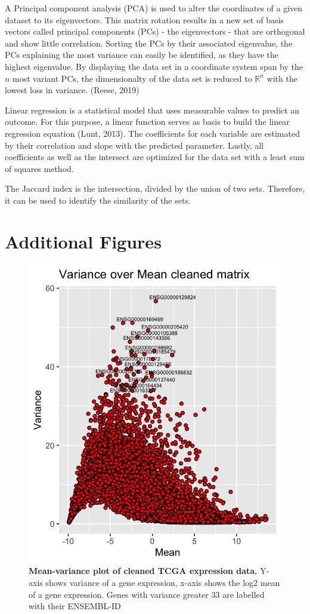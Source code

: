 \documentclass[
  11pt,
  parskip,
  oneside]{scrreprt}
\begin{document}
A Principal component analysis (PCA) is used to alter the coordinates of
a given dataset to its eigenvectors. This matrix rotation results in a
new set of basis vectors called principal components (PCs) - the
eigenvectors - that are orthogonal and show little correlation. Sorting
the PCs by their associated eigenvalue, the PCs explaining the most
variance can easily be identified, as they have the highest eigenvalue.
By displaying the data set in a coordinate system span by the \(n\) most
variant PCs, the dimensionalty of the data set is reduced to
\(\mathbb{R}^n\) with the lowest loss in variance. (Reese, 2019)

Linear regression is a statistical model that uses measurable values to
predict an outcome. For this purpose, a linear function serves as basis
to build the linear regression equation (Lunt, 2013). The coefficients
for each variable are estimated by their correlation and slope with the
predicted parameter. Lastly, all coefficients as well as the intersect
are optimized for the data set with a least sum of squares method.

The Jaccard index is the intersection, divided by the union of two sets.
Therefore, it can be used to identify the similarity of the sets.

\hypertarget{additional-figures}{%
\section{Additional Figures}\label{additional-figures}}

\begin{figure}

{\centering \includegraphics[width=0.65\linewidth]{figures/Variance_over mean_cleaned_matrix} 

}

\caption{\textbf{Mean-variance plot of cleaned TCGA expression data.} Y-axis shows variance of a gene expression, x-axis shows the log2 mean of a gene expression. Genes with variance greater 33 are labelled with their ENSEMBL-ID}\label{fig:showmeanvariance}
\end{figure}
\end{document}
